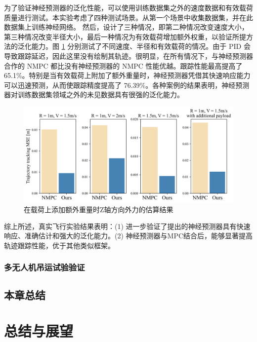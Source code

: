 \documentclass[lang=chs, degree=master, blindreview=false, winfonts=true]{yanputhesis}
\begin{document}
为了验证神经预测器的泛化性能，可以使用训练数据集之外的速度数据和有效载荷质量进行测试。本实验考虑了四种测试场景。从第一个场景中收集数据集，并在此数据集上训练神经网络。 然后，设计了三种情况，即第二种情况改变速度大小，第三种情况改变半径大小，最后一种情况为有效载荷增加额外权重，以验证所提方法的泛化能力。图 \ref{prediction_res} 分别测试了不同速度、半径和有效载荷的情况。由于 PID 会导致跟踪延迟，因此这里没有绘制其轨迹。很明显，在所有情况下，与神经预测器合作的 NMPC 都比没有神经预测器的 NMPC 性能优越。跟踪性能最高提高了 65.1\%。特别是当有效载荷上附加了额外重量时，神经预测器凭借其快速响应能力可以迅速预测，从而使跟踪精度提高了 76.39\%。各种案例的结果表明，神经预测器对训练数据集领域之外的未见数据具有很强的泛化能力。
\begin{figure}[hbt!]
	\centering
	\includegraphics[width=38pc]{picture/kk/prediction_res.png} 
	\caption{在载荷上添加额外重量时Z轴方向外力的估算结果} 
	\label{prediction_res}
\end{figure}

综上所述，真实飞行实验结果表明：(1) 进一步验证了提出的神经预测器具有快速响应、准确估计和强大的泛化能力。(2) 神经预测器与MPC结合后，能够显著提高轨迹跟踪性能，优于其他类似框架。

\subsection{多无人机吊运试验验证}

\section{本章总结}


\cleardoublepage

\chapter{总结与展望}
\end{document}
